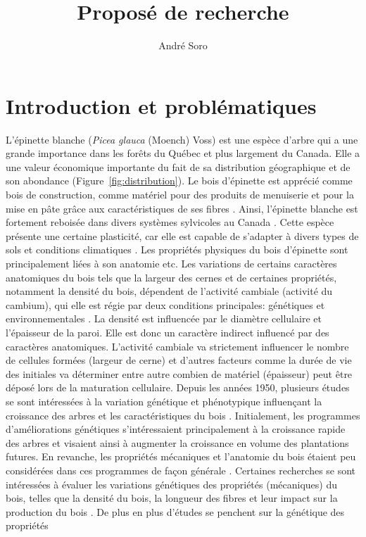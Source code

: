 \documentclass{report}
\title{Proposé de recherche}
\author{André Soro}
\begin{document}
	
	\maketitle
	\tableofcontents
	\listoffigures
	


\chapter*{Introduction et problématiques}

L'épinette blanche (\textit{Picea glauca} (Moench) Voss) est une espèce d'arbre qui a une grande importance dans les forêts du Québec et plus largement du Canada. Elle a une valeur économique importante du fait de sa distribution géographique et de son abondance (Figure~\ref{fig:distribution}). Le bois d'épinette est apprécié comme bois de construction, comme matériel pour des produits de menuiserie et pour la mise en pâte grâce aux caractéristiques de ses fibres \citep{Zhang2008}. Ainsi, l'épinette blanche est fortement reboisée dans  divers systèmes sylvicoles au Canada \citep{Canadian2009}. Cette espèce présente une certaine plasticité, car elle est capable de s'adapter à divers types de sols et conditions climatiques \citep{Nienstaedt1990}. Les propriétés physiques du bois d'épinette sont principalement liées à son anatomie \citep{Rossi2012} etc. Les variations de certains caractères anatomiques du bois tels que la largeur des cernes et de certaines propriétés, notamment la densité du bois, dépendent de l'activité cambiale (activité du cambium), qui elle est régie par deux conditions principales: génétiques et environnementales \citep{Dufour2010,Rossi2012}. La densité est influencée par le diamètre cellulaire et l'épaisseur de la paroi. Elle est donc un caractère indirect influencé par des caractères anatomiques. L'activité cambiale va strictement influencer le nombre de cellules formées (largeur de cerne) et d'autres facteurs comme la durée de vie des initiales va déterminer entre autre combien de matériel (épaisseur) peut être déposé lors de la maturation cellulaire. Depuis les années 1950, plusieurs études se sont intéressées à la variation génétique et phénotypique influençant la croissance des arbres et les caractéristiques du bois \citep{Corriveau1971,Li1993,Li1997}. Initialement, les programmes d'améliorations génétiques s'intéressaient principalement à la croissance rapide des arbres et visaient ainsi à augmenter la croissance en volume des plantations futures. En revanche, les  propriétés mécaniques et l'anatomie du bois étaient peu considérées dans ces programmes de façon générale \citep{Zhang1995}. Certaines recherches se sont intéressées à évaluer les variations génétiques des propriétés (mécaniques) du bois, telles que la densité du bois, la longueur des fibres et leur impact sur la production du bois \citep{Hernandez2001,Beaulieu2003}. De plus en plus d'études se penchent sur la génétique des propriétés 
\end{document}
